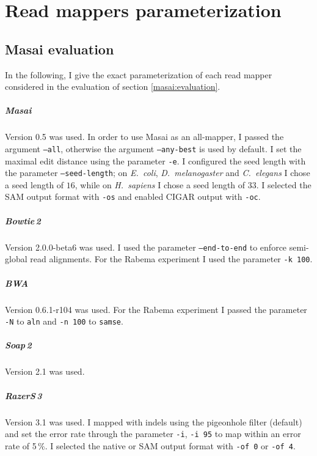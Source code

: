 \chapter{Read mappers parameterization}

\section{Masai evaluation}
\label{sup:masai:param}

In the following, I give the exact parameterization of each read mapper considered in the evaluation of section \ref{masai:evaluation}.

\paragraph{Masai}
Version 0.5 was used.
In order to use Masai as an all-mapper, I passed the argument \texttt{--all}, otherwise the argument \texttt{--any-best} is used by default.
I set the maximal edit distance using the parameter \texttt{-e}.
I configured the seed length with the parameter \texttt{--seed-length}; on \emph{E.~coli}, \emph{D.~melanogaster} and \emph{C.~elegans} I chose a seed length of $16$, while on \emph{H.~sapiens} I chose a seed length of $33$.
I selected the SAM output format with \texttt{-os} and enabled CIGAR output with \texttt{-oc}.

\paragraph{Bowtie\,2}
Version 2.0.0-beta6 was used.
I used the parameter \texttt{--end-to-end} to enforce semi-global read alignments.
For the Rabema experiment I used the parameter \texttt{-k 100}.

\paragraph{BWA}
Version 0.6.1-r104 was used.
For the Rabema experiment I passed the parameter \texttt{-N} to \texttt{aln} and \texttt{-n 100} to \texttt{samse}.

\paragraph{Soap\,2}
Version 2.1 was used.

\paragraph{RazerS\,3}
Version 3.1 was used.
I mapped with indels using the pigeonhole filter (default) and set the error rate through the parameter \texttt{-i}, \eg \texttt{-i 95} to map within an error rate of 5\,\%.
I selected the native or SAM output format with \texttt{-of 0} or \texttt{-of 4}.

